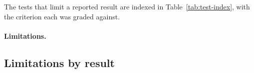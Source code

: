 The tests that limit a reported result are indexed in Table~\ref{tab:test-index}, with the criterion each was graded against.

\paragraph{Limitations.}

\subsection{Limitations by result}\label{recsec:limitations-results}

